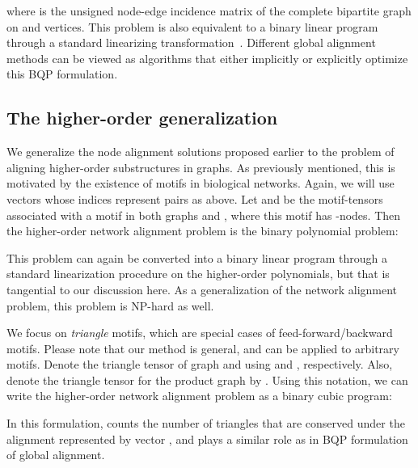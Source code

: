 \documentclass[10pt, journal, compsoc, final]{IEEEtran}
\begin{document}
where  is the unsigned node-edge incidence matrix of the complete bipartite
graph on  and  vertices. This problem is also equivalent to a binary linear program through a standard linearizing transformation~\cite{Natalie1,BP}. Different global alignment methods can be viewed as algorithms that either implicitly or explicitly 
optimize this BQP formulation.























\subsection{The higher-order generalization}

We generalize the node alignment solutions proposed earlier to the problem of aligning
higher-order substructures in graphs. As previously mentioned, 
this is motivated by the existence of motifs in
biological networks. Again, we will use vectors whose indices represent pairs  as above. 
Let  and  be the motif-tensors associated with a motif 
in both graphs  and , where this motif has -nodes. Then the 
higher-order network alignment problem is the binary polynomial problem:

This problem can again be converted into a binary linear program through a standard
linearization procedure on the higher-order polynomials, but that is tangential
to our discussion here. As a generalization of the network alignment problem,
this problem is NP-hard as well.
 
We focus on \textit{triangle} motifs,
which are special cases of feed-forward/backward motifs. Please note that our method
is general, and can be applied to arbitrary motifs.
Denote the triangle tensor of graph  and  using 
 and , respectively. Also, denote the 
triangle tensor for the product graph by . Using this notation, we can write 
the higher-order network alignment problem as a binary cubic program:

In this formulation,  counts the number of 
triangles that are conserved under the alignment represented by vector , and 
 plays a similar role as in BQP formulation of global alignment. 
\end{document}
